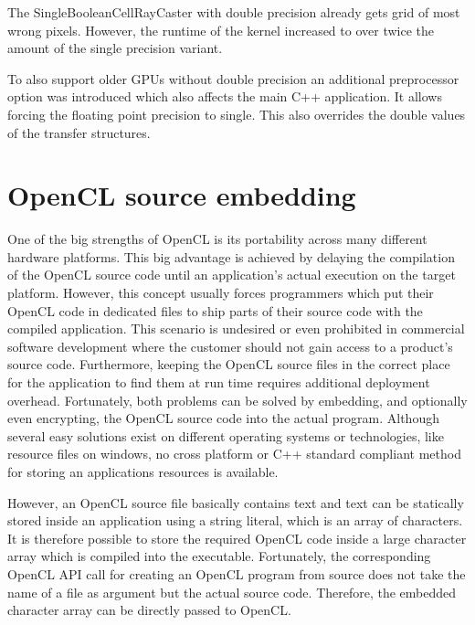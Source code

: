 The SingleBooleanCellRayCaster with double precision already gets grid of most wrong pixels. However, the runtime of the kernel increased to over twice the amount of the single precision variant.

To also support older GPUs without double precision an additional preprocessor option was introduced which also affects the main C++ application. It allows forcing the floating point precision to single. This also overrides the double values of the transfer structures.

\section{OpenCL source embedding}

One of the big strengths of OpenCL is its portability across many different hardware platforms. This big advantage is achieved by delaying the compilation of the OpenCL source code until an application's actual execution on the target platform. However, this concept usually forces programmers which put their OpenCL code in dedicated files to ship parts of their source code with the compiled application. This scenario is undesired or even prohibited in commercial software development where the customer should not gain access to a product's source code. Furthermore, keeping the OpenCL source files in the correct place for the application to find them at run time requires additional deployment overhead. Fortunately, both problems can be solved by embedding, and optionally even encrypting, the OpenCL source code into the actual program. Although several easy solutions exist on different operating systems or technologies, like resource files on windows, no cross platform or C++ standard compliant method for storing an applications resources is available.

However, an OpenCL source file basically contains text and text can be statically stored inside an application using a string literal, which is an array of characters. It is therefore possible to store the required OpenCL code inside a large character array which is compiled into the executable. Fortunately, the corresponding OpenCL API call for creating an OpenCL program from source does not take the name of a file as argument but the actual source code. Therefore, the embedded character array can be directly passed to OpenCL.

